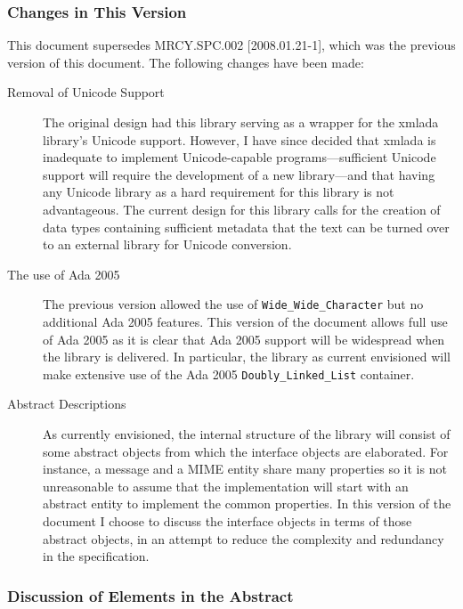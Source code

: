\documentclass[11pt]{article}
\begin{document}
\subsubsection{Changes in This Version}

This document supersedes MRCY.SPC.002 [2008.01.21-1], which was the
previous version of this document. The following changes have been
made:

\begin{description}

\item[Removal of Unicode Support] The original design had this library
  serving as a wrapper for the xmlada library's Unicode
  support. However, I have since decided that xmlada is inadequate to
  implement Unicode-capable programs---sufficient Unicode support
  will require the development of a new library---and that having any
  Unicode library as a hard requirement for this library is not
  advantageous. The current design for this library calls for the
  creation of data types containing sufficient metadata that the text
  can be turned over to an external library for Unicode conversion.

\item[The use of Ada 2005] The previous version allowed the use of
  \texttt{Wide\_Wide\_Char\-acter} but no additional Ada 2005
  features. This version of the document allows full use of Ada 2005
  as it is clear that Ada 2005 support will be widespread when the
  library is delivered. In particular, the library as current
  envisioned will make extensive use of the Ada 2005
  \texttt{Doubly\_Linked\_List} container.

\item[Abstract Descriptions] As currently envisioned, the internal
  structure of the library will consist of some abstract objects from
  which the interface objects are elaborated. For instance, a message
  and a MIME entity share many properties so it is not unreasonable to
  assume that the implementation will start with an abstract entity to
  implement the common properties. In this version of the document I
  choose to discuss the interface objects in terms of those abstract
  objects, in an attempt to reduce the complexity and redundancy in
  the specification.

\end{description} 


\subsubsection{Discussion of Elements in the Abstract}
\end{document}
